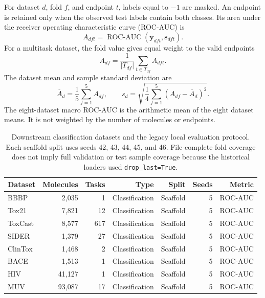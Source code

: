 \documentclass[journal=jcisd8,manuscript=article]{achemso}
\begin{document}
For dataset \(d\), fold \(f\), and endpoint \(t\), labels equal to \(-1\) are masked. An endpoint is retained only when the observed test labels contain both classes. Its area under the receiver operating characteristic curve (ROC-AUC) is
\begin{equation}
A_{dft}
=
\operatorname{ROC\mbox{-}AUC}
\left(
\mathbf y_{dft},
\mathbf s_{dft}
\right).
\end{equation}
For a multitask dataset, the fold value gives equal weight to the valid endpoints
\begin{equation}
A_{df}
=
\frac{1}{|T_{df}|}
\sum_{t\in T_{df}}
A_{dft}.
\end{equation}
The dataset mean and sample standard deviation are
\begin{equation}
\overline{A}_d
=
\frac{1}{5}\sum_{f=1}^{5}A_{df},
\qquad
s_d
=
\sqrt{
\frac{1}{4}
\sum_{f=1}^{5}
\left(
A_{df}-\overline{A}_d
\right)^2
}.
\end{equation}
The eight-dataset macro ROC-AUC is the arithmetic mean of the eight dataset means. It is not weighted by the number of molecules or endpoints.

\begin{table}[t]
\centering
\caption{Downstream classification datasets and the legacy local evaluation
protocol. Each scaffold split uses seeds 42, 43, 44, 45, and 46. File-complete
fold coverage does not imply full validation or test sample coverage because
the historical loaders used \texttt{drop\_last=True}.}
\label{tab:datasets}
\begin{tabular}{lrrrrrr}
\toprule
Dataset & Molecules & Tasks & Type & Split & Seeds & Metric \\
\midrule
BBBP & 2,035 & 1 & Classification & Scaffold & 5 & ROC-AUC \\
Tox21 & 7,821 & 12 & Classification & Scaffold & 5 & ROC-AUC \\
ToxCast & 8,577 & 617 & Classification & Scaffold & 5 & ROC-AUC \\
SIDER & 1,379 & 27 & Classification & Scaffold & 5 & ROC-AUC \\
ClinTox & 1,468 & 2 & Classification & Scaffold & 5 & ROC-AUC \\
BACE & 1,513 & 1 & Classification & Scaffold & 5 & ROC-AUC \\
HIV & 41,127 & 1 & Classification & Scaffold & 5 & ROC-AUC \\
MUV & 93,087 & 17 & Classification & Scaffold & 5 & ROC-AUC \\
\bottomrule
\end{tabular}
\end{table}
\end{document}
